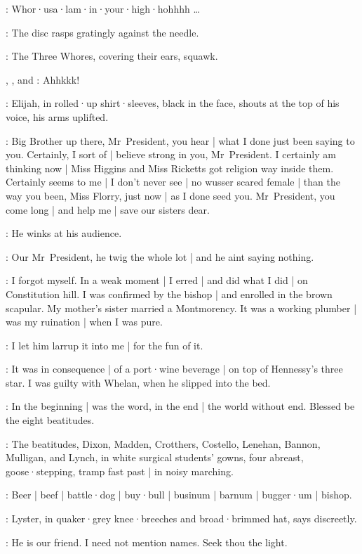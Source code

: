 \Gramophone:
Whor·usa·lam·in·your·high·hohhhh \ldots

:
The disc rasps gratingly against the needle.

:
The Three Whores,
covering their ears,
squawk.

\Zoe,
\Kitty,
and \Florry:
Ahhkkk!

:
Elijah,
in rolled·up shirt·sleeves,
black in the face,
shouts at the top of his voice,
his arms uplifted.

\Elijah:
Big Brother up there,
Mr~President,
you hear |
what I done just been saying to you.
Certainly,
I sort of |
believe strong in you,
Mr~President.
I certainly am thinking now |
Miss Higgins and Miss Ricketts got religion way inside them.
Certainly seems to me |
I don't never see |
no wusser scared female |
than the way you been,
Miss Florry,
just now |
as I done seed you.
Mr~President,
you come long |
and help me |
save our sisters dear.

:
He winks at his audience.

\Elijah:
Our Mr~President,
he twig the whole lot |
and he aint saying nothing.

\KittyKate[2]:
I forgot myself.
In a weak moment |
I erred |
and did what I did |
on Constitution hill.
I was confirmed by the bishop |
and enrolled in the brown scapular.
My mother's sister married a Montmorency.
It was a working plumber |
was my ruination |
when I was pure.

\ZoeFanny[2]:
I let him larrup it into me |
for the fun of it.

\FlorryTeresa[2]:
It was in consequence |
of a port·wine beverage |
on top of Hennessy's three star.
I was guilty with Whelan,
when he slipped into the bed.

\Stephen[1]:
In the beginning |
was the word,
in the end |
the world without end.
Blessed be the eight beatitudes.

:
The beatitudes,
Dixon,
Madden,
Crotthers,
Costello,
Lenehan,
Bannon,
Mulligan,
and Lynch,
in white surgical students' gowns,
four abreast,
goose·stepping,
tramp fast past |
in noisy marching.

\Beatitudes:
Beer |
beef |
battle·dog |
buy·bull |
businum |
barnum |
bugger·um |
bishop.

:
Lyster,
in quaker·grey knee·breeches and broad·brimmed hat,
says discreetly.

\Lyster:
He is our friend.
I need not mention names.
Seek thou the light.

